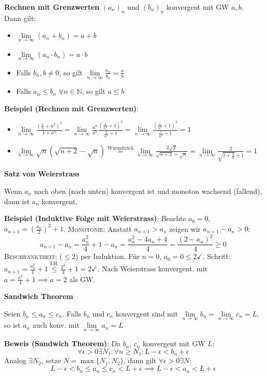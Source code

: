 \documentclass[25pt]{sciposter}
\newcommand{\limm}{\lim\limits_{n \to \infty}}
\newenvironment{method}[1]{\begin{mdframed}[backgroundcolor=blue!10,innertopmargin=15pt, innerbottommargin=15pt, nobreak=true]
		\textbf{#1 }
	}
	{ 
	\end{mdframed}
}
\begin{document}
\begin{multicols}{3}
\begin{method}{Rechnen mit Grenzwerten} $(a_n)_n$ und $(b_n)_n$ konvergent mit GW $a,b$. Dann gilt:
	\begin{itemize}
		\item $\lim \limits_{n \to \infty} (a_n + b_n) = a + b$	
		\item $\lim \limits_{n \to \infty} (a_n \cdot b_n) = a \cdot b$
		\item  Falls $b_n, b \not = 0$, so gilt $\lim \limits_{n \to \infty} \frac{a_n}{b_n} = \frac{a}{b}$
		\item Falls $a_n \leq b_n$ $\forall n \in \mathbb{N}$, so gilt $a \leq b$
	\end{itemize}
\end{method}

\textbf{Beispiel (Rechnen mit Grenzwerten)}: 
\begin{itemize}
	\item $\limm  \frac{(\frac{1}{n} + n^2 )^3}{1 + n^6} = \limm \frac{n^6}{n^6} \frac{(\frac{1}{n^3} + 1 )^3}{\frac{1}{n^6} + 1} = \limm \frac{(\frac{1}{n^3} + 1 )^3}{\frac{1}{n^6} + 1} = 1$
	
	\item $\limm \sqrt{n} (\sqrt{n + 2} - \sqrt{n}) \stackrel{\text{Wurzeltrick}}{=} \limm \frac{2 \sqrt{2}}{\sqrt{n+2} + \sqrt{n}} = \limm  \frac{2}{\sqrt{1 + \frac{2}{n}} + 1} = 1$
\end{itemize}

\begin{method}{Satz von Weierstrass}
	Wenn $a_n$ nach oben (nach unten) konvergent ist und monoton wachsend (fallend), dann ist $a_n$ konvergent.
\end{method}

\textbf{Beispiel (Induktive Folge mit Weierstrass)}: 
Beachte $a_0 = 0$, $a_{n+1} = \left(\frac{a_n}{2}\right)^2 + 1$. \textsc{Monotonie:} Anstatt $a_{n+1} > a_{n}$ zeigen wir $a_{n+1} - a_{n} > 0$:
$$a_{n+1} - a_{n} = \frac{a_n ^2}{4} + 1 - a_n = \frac{a_n ^2 -4a_n + 4}{4} = \frac{(2-a_n)^2}{4} \geq 0$$
\textsc{Beschränktheit:} ($\leq 2$) per Induktion. Für $n=0$, $a_0 = 0 \leq 2 \checkmark$. Schritt: $a_{n+1} = \frac{a_n ^2}{4} + 1 \stackrel{\text{I.H.}}{\leq} \frac{2^2}{4} +1 = 2 \checkmark$. Nach Weierstrass konvergent. mit $a = \frac{a^2}{4} + 1 \implies a = 2$ als GW.


\begin{method}{Sandwich Theorem}
Seien $b_n \leq a_n \leq c_n$. Falls $b_n$ und $c_n$ konvergent sind mit $\lim \limits_{n \to \infty } b_n = \lim \limits_{n \to \infty } c_n = L$, so ist $a_n$ auch konv. mit $\lim \limits_{n \to \infty } a_n = L$
\end{method}
\textbf{Beweis (Sandwich Theorem)}: 
Da $b_n$, $c_n$ konvergent mit GW $L$:
$$\forall \epsilon > 0 \exists N_1 : \forall n \geq N_1 : L-\epsilon < b_n + \epsilon$$
Analog  $ \exists N_2$, setze $N = \max\{N_1, N_2\}$, dann gilt $\forall \epsilon > 0 \exists N$:
$$L-\epsilon < b_n \leq a_n \leq c_n < L + \epsilon \implies L - \epsilon < a_n < L + \epsilon$$



\end{multicols}
\end{document}

